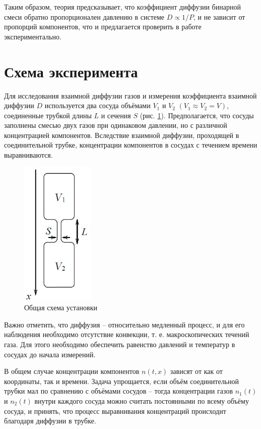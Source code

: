 \documentclass[a4paper,12pt]{article} %
\begin{document}
Таким образом, теория предсказывает, что коэффициент диффузии бинарной смеси обратно пропорционален давлению в системе $ D \propto 1/P $, и не зависит от пропорций компонентов, что и предлагается проверить в работе экспериментально.

\section{Схема эксперимента}

Для исследования взаимной диффузии газов и измерения коэффициента взаимной диффузии $ D $ используется два сосуда объёмами $ V_1 $ и $ V_2 $ $ (V_1\approx V_2=V) $, соединенные трубкой длины $ L $ и сечения $ S $ (рис. \ref{ris1}). Предполагается, что сосуды заполнены смесью двух газов при одинаковом давлении, но с различной концентрацией компонентов. Вследствие взаимной диффузии, проходящей в соединительной трубке, концентрации компонентов в сосудах с течением времени выравниваются. 

\begin{figure}
	\includegraphics[width=3.5cm]{ris1.jpg}
	\caption{Общая схема установки}
	\label{ris1}
\end{figure}

Важно отметить, что диффузия -- относительно медленный процесс, и для его наблюдения необходимо отсутствие конвекции, т. е. макроскопических течений газа. Для этого необходимо обеспечить равенство давлений и температур в сосудах до начала измерений.

В общем случае концентрации компонентов $ n(t, x) $ зависят от как от координаты, так и времени. Задача упрощается, если объём соединительной трубки мал по сравнению с объёмами сосудов -- тогда концентрации газов $ n_1(t) $ и $ n_2(t) $ внутри каждого сосуда можно считать постоянными по всему объёму сосуда, и принять, что процесс выравнивания концентраций происходит благодаря диффузии в трубке.
\end{document}
